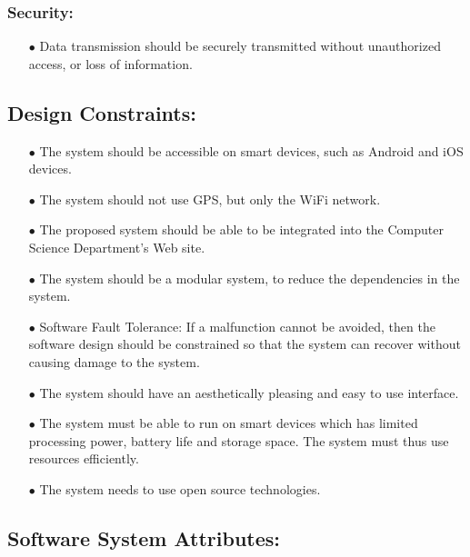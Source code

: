 \documentclass[english]{article}
\begin{document}
\subsubsection{Security:}
\begin{itemize}
\item[$\bullet$]Data transmission should be securely transmitted without unauthorized access, or loss of information.
\end{itemize}

\subsection{Design Constraints:}

\begin{itemize}
\item[$\bullet$]The system should be accessible on smart devices, such as Android and iOS devices.
\item[$\bullet$] The system should not use GPS, but only the WiFi network.
\item[$\bullet$] The proposed system should be able to be integrated into the Computer Science Department's Web site.
\item[$\bullet$]The system should be a modular system, to reduce the dependencies in the system.
\item[$\bullet$]Software Fault Tolerance: If a malfunction cannot be avoided, then the software design should be constrained so that the system can recover without causing damage to the system.
\item[$\bullet$]The system should have an aesthetically pleasing and easy to use interface.
\item[$\bullet$]The system must be able to run on smart devices which has limited processing power, battery life and storage space. The system must thus use resources efficiently. 
\item[$\bullet$]The system needs to use open source technologies.
\end{itemize}	

\subsection{Software System Attributes:}
\end{document}
